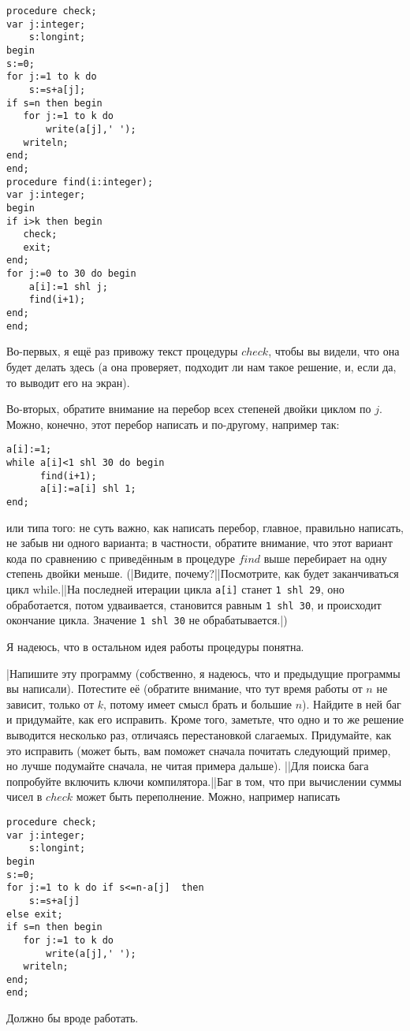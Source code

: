\begin{codesample}\begin{verbatim}
procedure check;
var j:integer;  
    s:longint;
begin
s:=0;
for j:=1 to k do
    s:=s+a[j];
if s=n then begin
   for j:=1 to k do
       write(a[j],' ');
   writeln;
end;
end;
procedure find(i:integer);
var j:integer;
begin
if i>k then begin
   check;
   exit;
end;
for j:=0 to 30 do begin
    a[i]:=1 shl j;
    find(i+1);
end;
end;
\end{verbatim}
\end{codesample}

Во-первых, я ещё раз привожу текст процедуры $check$, чтобы вы видели, что она 
будет делать здесь (а она проверяет, подходит ли нам такое решение, и, если да, 
то выводит его на экран).

Во-вторых, обратите внимание на перебор всех степеней двойки циклом по $j$. 
Можно, конечно, этот перебор написать и по-другому, например так:

\begin{codesampleo}\begin{verbatim}
a[i]:=1;
while a[i]<1 shl 30 do begin
      find(i+1);
      a[i]:=a[i] shl 1;
end;
\end{verbatim}
\end{codesampleo}
или типа того: не суть важно, как написать перебор, главное, правильно написать, не 
забыв ни одного варианта; в частности, обратите внимание, что этот вариант кода по сравнению с приведённым в 
процедуре $find$ выше перебирает на одну степень двойки меньше. (|Видите, почему?||Посмотрите, как будет заканчиваться цикл while.||На последней итерации цикла \texttt{a[i]} станет \texttt{1 shl 29}, оно обработается, потом удваивается, становится равным \texttt{1 shl 30}, и происходит окончание цикла. Значение \texttt{1 shl 30} не обрабатывается.|)

Я надеюсь, что в остальном идея работы процедуры понятна.

\task|Напишите эту программу (собственно, я надеюсь, что и предыдущие 
   программы вы написали). 
  Потестите её (обратите внимание, что тут время работы от $n$ не зависит, 
   только от $k$, потому имеет смысл брать и большие $n$). Найдите в ней баг и 
   придумайте, как его исправить. 
 Кроме того, заметьте, что одно и то же решение выводится несколько 
   раз, отличаясь перестановкой слагаемых. Придумайте, как это исправить (может 
   быть, вам поможет сначала почитать следующий пример, но лучше подумайте 
   сначала, не читая примера дальше).
||Для поиска бага попробуйте включить ключи компилятора.||Баг в том, что при вычислении суммы чисел в $check$ может быть переполнение. Можно, например 
 написать
\begin{codesampleo}\begin{verbatim}
procedure check;
var j:integer;  
    s:longint;
begin
s:=0;
for j:=1 to k do if s<=n-a[j]  then
    s:=s+a[j]
else exit;
if s=n then begin
   for j:=1 to k do
       write(a[j],' ');
   writeln;
end;
end;
\end{verbatim}
\end{codesampleo}
Должно бы вроде работать.

